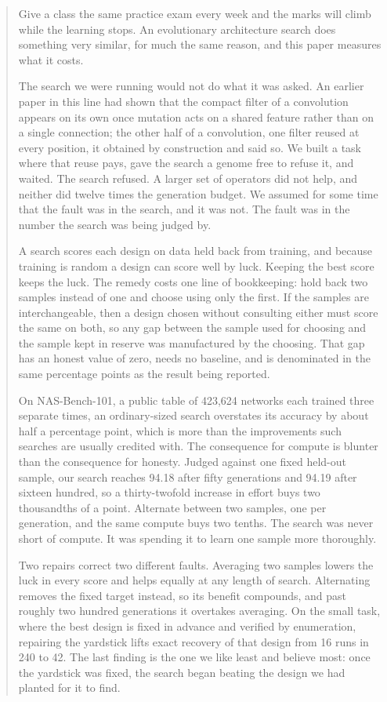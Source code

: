 \documentclass[11pt]{article}
\begin{document}
\begin{abstract}
Give a class the same practice exam every week and the marks will climb while the learning stops. An
evolutionary architecture search does something very similar, for much the same reason, and this paper
measures what it costs.

The search we were running would not do what it was asked. An earlier paper in this line had shown that
the compact filter of a convolution appears on its own once mutation acts on a shared feature rather than
on a single connection; the other half of a convolution, one filter reused at every position, it obtained
by construction and said so. We built a task where that reuse pays, gave the search a genome
free to refuse it, and waited. The search refused. A larger set of operators did not help, and neither
did twelve times the generation budget. We assumed for some time that the fault was in the search, and it
was not. The fault was in the number the search was being judged by.

A search scores each design on data held back from training, and because training is random a design can
score well by luck. Keeping the best score keeps the luck. The remedy costs one line of bookkeeping: hold
back two samples instead of one and choose using only the first. If the samples are interchangeable, then
a design chosen without consulting either must score the same on both, so any gap between the sample used
for choosing and the sample kept in reserve was manufactured by the choosing. That gap has an honest value
of zero, needs no baseline, and is denominated in the same percentage points as the result being reported.

On NAS-Bench-101, a public table of 423,624 networks each trained three separate times, an ordinary-sized
search overstates its accuracy by about half a percentage point, which is more than the improvements such
searches are usually credited with. The consequence for compute is blunter than the consequence for
honesty. Judged against one fixed held-out sample, our search reaches 94.18 after fifty generations and
94.19 after sixteen hundred, so a thirty-twofold increase in effort buys two thousandths of a point.
Alternate between two samples, one per generation, and the same compute buys two tenths. The search was
never short of compute. It was spending it to learn one sample more thoroughly.

Two repairs correct two different faults. Averaging two samples lowers the luck in every score and helps
equally at any length of search. Alternating removes the fixed target instead, so its benefit compounds,
and past roughly two hundred generations it overtakes averaging. On the small task, where the best design
is fixed in advance and verified by enumeration, repairing the yardstick lifts exact recovery of that
design from 16 runs in 240 to 42. The last finding is the one we like least and believe most: once the
yardstick was fixed, the search began beating the design we had planted for it to find.
\end{abstract}
\end{document}
